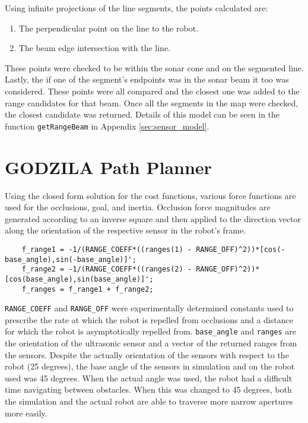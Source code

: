 Using infinite projections of the line segments, the points calculated are: 
\begin{enumerate}
	\item The perpendicular point on the line to the robot.
	\item The beam edge intersection with the line.
\end{enumerate}
These points were checked to be within the sonar cone and on the segmented line. Lastly, the if one of the segment's endpoints was in the sonar beam it too was considered. These points were all compared and the closest one was added to the range candidates for that beam. Once all the segments in the map were checked, the closest candidate was returned. Details of this model can be seen in the function \lstinline$getRangeBeam$ in Appendix \ref{sec:sensor_model}.

\section{GODZILA Path Planner}

Using the closed form solution for the cost functions, various force functions are used for the occlusions, goal, and inertia.
Occlusion force magnitudes are generated according to an inverse square and then applied to the direction vector along the orientation of the respective sensor in the robot's frame.

\begin{lstlisting}
	f_range1 = -1/(RANGE_COEFF*((ranges(1) - RANGE_OFF)^2))*[cos(-base_angle),sin(-base_angle)]';
	f_range2 = -1/(RANGE_COEFF*((ranges(2) - RANGE_OFF)^2))*[cos(base_angle),sin(base_angle)]';
	f_ranges = f_range1 + f_range2;
\end{lstlisting}
\lstinline$RANGE_COEFF$ and \lstinline$RANGE_OFF$ were experimentally determined constants used to prescribe the rate at which the robot is repelled from occlusions and a distance for which the robot is asymptotically repelled from. \lstinline$base_angle$ and \lstinline$ranges$ are the orientation of the ultrasonic sensor and a vector of the returned ranges from the sensors. Despite the actually orientation of the sensors with respect to the robot (25 degrees), the base angle of the sensors in simulation and on the robot used was 45 degrees. When the actual angle was used, the robot had a difficult time navigating between obstacles. When this was changed to 45 degrees, both the simulation and the actual robot are able to traverse more narrow apertures more easily.


